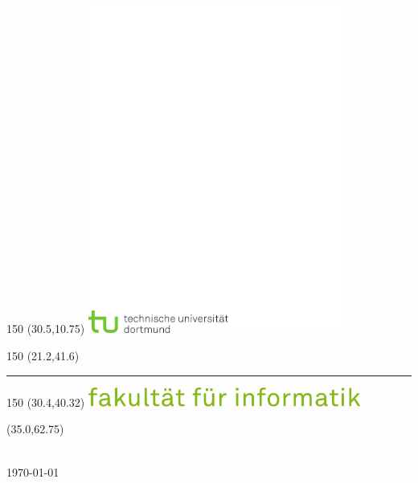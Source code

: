 \begin{titlepage}

\begin{textblock}{150} (30.5,10.75)
\includegraphics[width=83.25mm]{bilder/tu_logo.pdf}
\end{textblock}

\begin{textblock}{150} (21.2,41.6)
{\color{red}\rule{5mm}{5mm}}
\end{textblock}

\begin{textblock}{150} (30.4,40.32)
\includegraphics[width=90mm]{bilder/fi_text.pdf}
\end{textblock}

\begin{textblock}{80} (35.0,62.75)
  \vfill
  \begin{center}
    \fontsize{24pt}{24pt}
    \textsf \Arbeit{}
    \vspace{1cm}

    \begin{onehalfspace}
      \fontsize{18pt}{18pt}
      \textsf \Titel{}
    \end{onehalfspace}

    \vspace{12mm}

    \begin{onehalfspace}
      {\fontsize{14pt}{14pt}
      \textsf \Autor{}\\
      \textsf \today}
    \end{onehalfspace}
  \end{center}
  \vfill
\end{textblock}


\end{titlepage}
